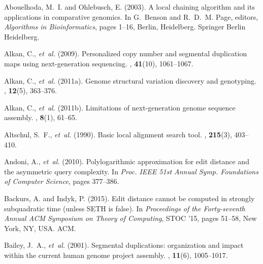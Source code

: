 \documentclass{article}
\begin{document}
\begin{thebibliography}{}

Abouelhoda, M.~I. and Ohlebusch, E. (2003).
\newblock A local chaining algorithm and its applications in comparative
  genomics.
\newblock In G.~Benson and R.~D.~M. Page, editors, {\em Algorithms in
  Bioinformatics\/}, pages 1--16, Berlin, Heidelberg. Springer Berlin
  Heidelberg.

Alkan, C., {\em et~al.} (2009).
\newblock Personalized copy number and segmental duplication maps using
  next-generation sequencing.
, {\bf 41}(10), 1061--1067.

Alkan, C., {\em et~al.} (2011a).
\newblock Genome structural variation discovery and genotyping.
, {\bf 12}(5), 363--376.

Alkan, C., {\em et~al.} (2011b).
\newblock Limitations of next-generation genome sequence assembly.
, {\bf 8}(1), 61--65.

Altschul, S.~F., {\em et~al.} (1990).
\newblock Basic local alignment search tool.
, {\bf 215}(3), 403--410.

Andoni, A., {\em et~al.} (2010).
\newblock Polylogarithmic approximation for edit distance and the asymmetric
  query complexity.
\newblock In {\em Proc. IEEE 51st Annual Symp. Foundations of Computer
  Science\/}, pages 377--386.

Backurs, A. and Indyk, P. (2015).
\newblock Edit distance cannot be computed in strongly subquadratic time
  (unless {SETH} is false).
\newblock In {\em Proceedings of the Forty-seventh Annual {ACM} Symposium on
  Theory of Computing\/}, STOC '15, pages 51--58, New York, NY, USA. ACM.

Bailey, J.~A., {\em et~al.} (2001).
\newblock Segmental duplications: organization and impact within the current
  human genome project assembly.
, {\bf 11}(6), 1005--1017.


\end{thebibliography}
\end{document}
